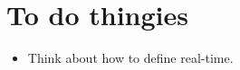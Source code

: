 \section{To do thingies}\label{sec:ch2label}
\begin{itemize}
  \item Think about how to define real-time.
\end{itemize}